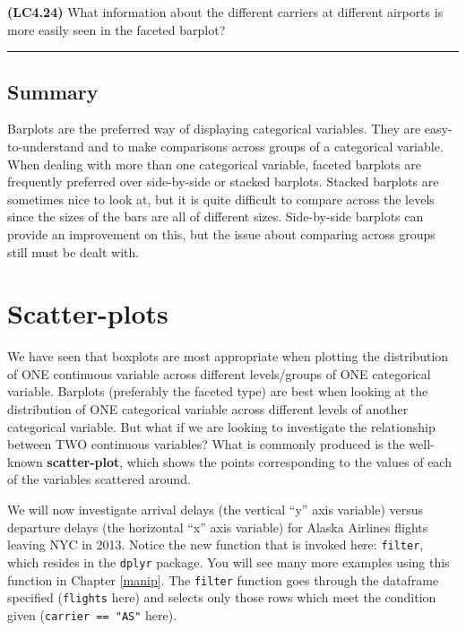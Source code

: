\documentclass[]{tufte-book}
\begin{document}
\textbf{(LC4.24)} What information about the different carriers at
different airports is more easily seen in the faceted barplot?

\begin{center}\rule{0.5\linewidth}{\linethickness}\end{center}

\subsection{Summary}\label{summary-2}

Barplots are the preferred way of displaying categorical variables. They
are easy-to-understand and to make comparisons across groups of a
categorical variable. When dealing with more than one categorical
variable, faceted barplots are frequently preferred over side-by-side or
stacked barplots. Stacked barplots are sometimes nice to look at, but it
is quite difficult to compare across the levels since the sizes of the
bars are all of different sizes. Side-by-side barplots can provide an
improvement on this, but the issue about comparing across groups still
must be dealt with.

\section{Scatter-plots}\label{scatter-plots}

We have seen that boxplots are most appropriate when plotting the
distribution of ONE continuous variable across different levels/groups
of ONE categorical variable. Barplots (preferably the faceted type) are
best when looking at the distribution of ONE categorical variable across
different levels of another categorical variable. But what if we are
looking to investigate the relationship between TWO continuous
variables? What is commonly produced is the well-known
\textbf{scatter-plot}, which shows the points corresponding to the
values of each of the variables scattered around.

We will now investigate arrival delays (the vertical ``y'' axis
variable) versus departure delays (the horizontal ``x'' axis variable)
for Alaska Airlines flights leaving NYC in 2013. Notice the new function
that is invoked here: \texttt{filter}, which resides in the
\texttt{dplyr} package. You will see many more examples using this
function in Chapter \ref{manip}. The \texttt{filter} function goes
through the dataframe specified (\texttt{flights} here) and selects only
those rows which meet the condition given (\texttt{carrier\ ==\ "AS"}
here).
\end{document}

